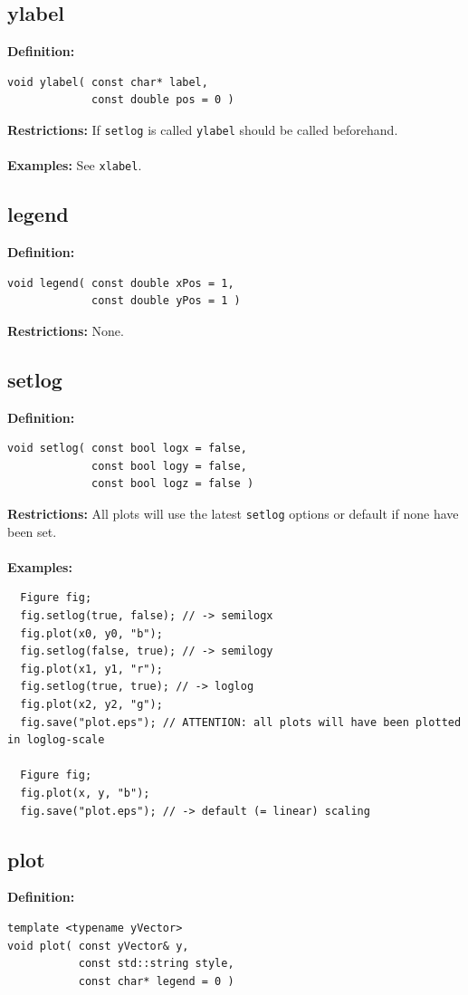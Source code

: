\documentclass[a4paper]{article}
\newcommand{\command}[1]{\subsection{#1}}
\begin{document}
\newpage
\command{ylabel}

\textbf{Definition:}
\begin{lstlisting}
void ylabel( const char* label, 
             const double pos = 0 )
\end{lstlisting}
%
\textbf{Restrictions:} If \texttt{setlog} is called \texttt{ylabel} should be called beforehand. \\ \\
%
\textbf{Examples:} See \texttt{xlabel}.

\command{legend}

\textbf{Definition:}
\begin{lstlisting}
void legend( const double xPos = 1, 
             const double yPos = 1 )
\end{lstlisting}
%
\textbf{Restrictions:} None. 

\command{setlog}

\textbf{Definition:}
\begin{lstlisting}
void setlog( const bool logx = false, 
             const bool logy = false,
             const bool logz = false )
\end{lstlisting}
%
\textbf{Restrictions:} All plots will use the latest \texttt{setlog} options or default if none have been set. \\ \\
%
\textbf{Examples:}
\begin{lstlisting}
  Figure fig;
  fig.setlog(true, false); // -> semilogx
  fig.plot(x0, y0, "b"); 
  fig.setlog(false, true); // -> semilogy
  fig.plot(x1, y1, "r");
  fig.setlog(true, true); // -> loglog
  fig.plot(x2, y2, "g");
  fig.save("plot.eps"); // ATTENTION: all plots will have been plotted in loglog-scale 

  Figure fig;
  fig.plot(x, y, "b");
  fig.save("plot.eps"); // -> default (= linear) scaling
\end{lstlisting}

\newpage
\command{plot} 

\textbf{Definition:} 
\begin{lstlisting}
template <typename yVector>
void plot( const yVector& y, 
           const std::string style, 
           const char* legend = 0 )
\end{lstlisting}
\end{document}
